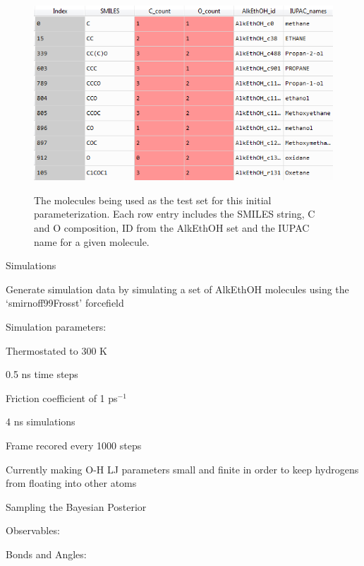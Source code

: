 \documentclass{report}
\begin{document}
\begin{outline}
\begin{outline}
\begin{outline}
\begin{figure}[h!]
      \includegraphics[width=.9\linewidth]{bayes1_mols.PNG}
      \label{fig:sub1}
      \caption{The molecules being used as the test set for this initial parameterization. Each row entry includes the SMILES string, C and O composition, 
               ID from the AlkEthOH set and the IUPAC name for a given molecule.}
      \end{figure}
    \end{outline}
    \item{Simulations}
    \begin{outline}
      \item{Generate simulation data by simulating a set of AlkEthOH molecules using the ‘smirnoff99Frosst’ forcefield}
      \item{Simulation parameters:}
      \begin{outline}
        \item{Thermostated to 300 K}
        \item{0.5 ns time steps}
        \item{Friction coefficient of 1 ps$^{-1}$}
        \item{4 ns simulations}
        \item{Frame recored every 1000 steps}
      \end{outline}
      \item{Currently making O-H LJ parameters small and finite in order to keep hydrogens from floating into other atoms}
    \end{outline}
    \item{Sampling the Bayesian Posterior}
    \begin{outline}
      \item{Observables:}
      \begin{outline}
        \item{Bonds and Angles:}
        \begin{outline}

\end{outline}
\end{outline}
\end{outline}
\end{outline}
\end{outline}
\end{document}
